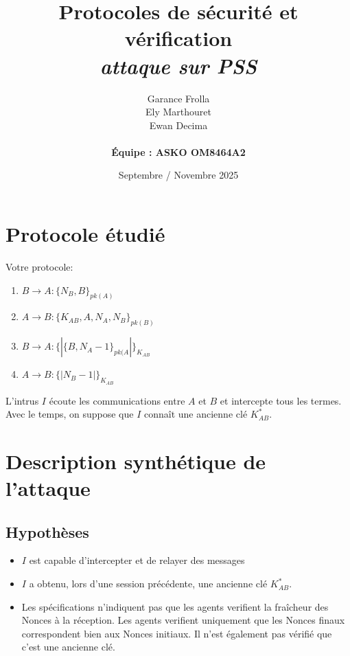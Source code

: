 \documentclass[11pt]{article}
\begin{document}
\title{\textbf{Protocoles de sécurité et vérification} \\
{\small \textit{attaque sur PSS}}}

\author{Garance Frolla \\ Ely Marthouret \\ Ewan Decima \\\\ \textbf{Équipe : ASKO OM8464A2}}
\date{Septembre / Novembre 2025}

\maketitle
\tableofcontents
\newpage

\section{Protocole étudié}

Votre protocole:

\begin{enumerate}
    \item $B \rightarrow A : \{N_B,B\}_{pk(A)}$
    \item $A \rightarrow B : \{K_{AB},A,N_A,N_B\}_{pk(B)}$
    \item $B \rightarrow A : \{|\{B,N_A -1\}_{pk(A}|\}_{K_{AB}}$
    \item $A \rightarrow B : \{|N_B -1|\}_{K_{AB}}$
\end{enumerate}

\bigskip
\noindent
L'intrus $I$ écoute les communications entre $A$ et $B$ et intercepte tous les termes. Avec le temps, on suppose que $I$ connaît une ancienne clé $K_{AB}^*$.

\section{Description synthétique de l'attaque}

\subsection{Hypothèses}
\begin{itemize}
    \item $I$ est capable d'intercepter et de relayer des messages 
    \item $I$ a obtenu, lors d'une session précédente, une ancienne clé $K_{AB}^*$.
    \item Les spécifications n'indiquent pas que les agents verifient la fraîcheur des Nonces à la réception. Les agents verifient uniquement que les Nonces finaux correspondent bien aux Nonces initiaux. Il n'est également pas vérifié que c'est une ancienne clé.

    

\end{itemize}
\end{document}
